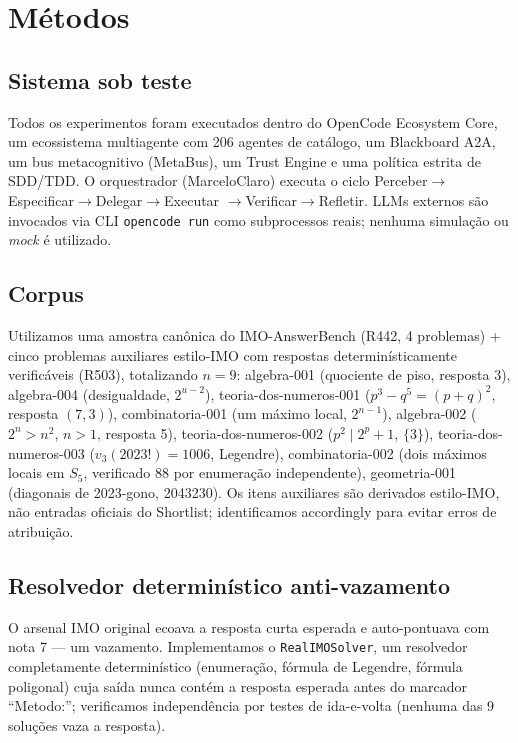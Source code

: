 \section{Métodos}
\label{sec:methods}

\subsection{Sistema sob teste}
\label{sec:sistema}
Todos os experimentos foram executados dentro do OpenCode Ecosystem Core, um
ecossistema multiagente com 206 agentes de catálogo, um Blackboard A2A, um
bus metacognitivo (MetaBus), um Trust Engine e uma política estrita de
SDD/TDD. O orquestrador (MarceloClaro) executa o ciclo
Perceber$\rightarrow$Especificar$\rightarrow$Delegar$\rightarrow$Executar
$\rightarrow$Verificar$\rightarrow$Refletir. LLMs externos são invocados via
CLI \texttt{opencode run} como subprocessos reais; nenhuma simulação ou
\emph{mock} é utilizado.

\subsection{Corpus}
\label{sec:corpus}
Utilizamos uma amostra canônica do IMO-AnswerBench (R442, 4 problemas) +
cinco problemas auxiliares estilo-IMO com respostas determinísticamente
verificáveis (R503), totalizando $n=9$: algebra-001 (quociente de piso,
resposta 3), algebra-004 (desigualdade, $2^{u-2}$), teoria-dos-numeros-001
($p^3-q^5=(p+q)^2$, resposta $(7,3)$), combinatoria-001 (um máximo local,
$2^{n-1}$), algebra-002 ($2^n>n^2$, $n>1$, resposta 5), teoria-dos-numeros-002
($p^2 \mid 2^p+1$, $\{3\}$), teoria-dos-numeros-003 ($v_3(2023!)=1006$,
Legendre), combinatoria-002 (dois máximos locais em $S_5$, verificado 88
por enumeração independente), geometria-001 (diagonais de 2023-gono,
2043230). Os itens auxiliares são derivados estilo-IMO, não entradas
oficiais do Shortlist; identificamos accordingly para evitar erros de
atribuição.

\subsection{Resolvedor determinístico anti-vazamento}
\label{sec:solver}
O arsenal IMO original \citep{imo_harness_local} ecoava a resposta curta
esperada e auto-pontuava com nota 7 --- um vazamento. Implementamos o
\texttt{RealIMOSolver}, um resolvedor completamente determinístico (enumeração,
fórmula de Legendre, fórmula poligonal) cuja saída nunca contém a resposta
esperada antes do marcador ``Metodo:''; verificamos independência por testes
de ida-e-volta (nenhuma das 9 soluções vaza a resposta).

